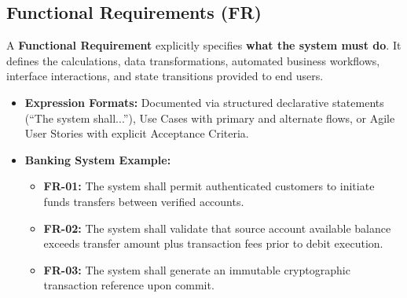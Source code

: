 \subsection{Functional Requirements (FR)}
A \textbf{Functional Requirement} explicitly specifies \textbf{what the system must do}. It defines the calculations, data transformations, automated business workflows, interface interactions, and state transitions provided to end users.
\begin{itemize}
    \item \textbf{Expression Formats:} Documented via structured declarative statements (``The system shall...''), Use Cases with primary and alternate flows, or Agile User Stories with explicit Acceptance Criteria.
    \item \textbf{Banking System Example:}
    \begin{itemize}
        \item \textbf{FR-01:} The system shall permit authenticated customers to initiate funds transfers between verified accounts.
        \item \textbf{FR-02:} The system shall validate that source account available balance exceeds transfer amount plus transaction fees prior to debit execution.
        \item \textbf{FR-03:} The system shall generate an immutable cryptographic transaction reference upon commit.
    \end{itemize}
\end{itemize}

